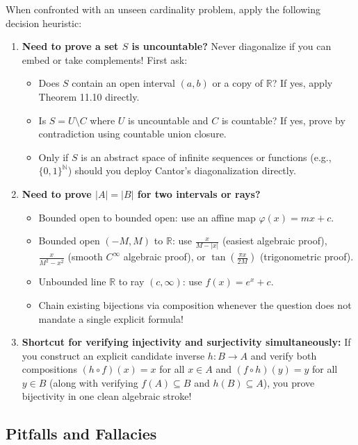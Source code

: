 \documentclass[11pt, letterpaper]{article}
\theoremstyle{definition}
\theoremstyle{remark}
\begin{document}
When confronted with an unseen cardinality problem, apply the following decision heuristic:
\begin{enumerate}
    \item \textbf{Need to prove a set $S$ is uncountable?} Never diagonalize if you can embed or take complements! First ask:
    \begin{itemize}
        \item Does $S$ contain an open interval $(a, b)$ or a copy of $\mathbb{R}$? If yes, apply Theorem 11.10 directly.
        \item Is $S = U \setminus C$ where $U$ is uncountable and $C$ is countable? If yes, prove by contradiction using countable union closure.
        \item Only if $S$ is an abstract space of infinite sequences or functions (e.g., $\{0, 1\}^{\mathbb{N}}$) should you deploy Cantor's diagonalization directly.
    \end{itemize}
    \item \textbf{Need to prove $|A| = |B|$ for two intervals or rays?}
    \begin{itemize}
        \item Bounded open to bounded open: use an affine map $\varphi(x) = mx + c$.
        \item Bounded open $(-M, M)$ to $\mathbb{R}$: use $\frac{x}{M - |x|}$ (easiest algebraic proof), $\frac{x}{M^2 - x^2}$ (smooth $C^\infty$ algebraic proof), or $\tan\left(\frac{\pi x}{2M}\right)$ (trigonometric proof).
        \item Unbounded line $\mathbb{R}$ to ray $(c, \infty)$: use $f(x) = e^x + c$.
        \item Chain existing bijections via composition whenever the question does not mandate a single explicit formula!
    \end{itemize}
    \item \textbf{Shortcut for verifying injectivity and surjectivity simultaneously:} If you construct an explicit candidate inverse $h : B \to A$ and verify both compositions $(h \circ f)(x) = x$ for all $x \in A$ and $(f \circ h)(y) = y$ for all $y \in B$ (along with verifying $f(A) \subseteq B$ and $h(B) \subseteq A$), you prove bijectivity in one clean algebraic stroke!
\end{enumerate}

\subsection{Pitfalls and Fallacies}
\end{document}

